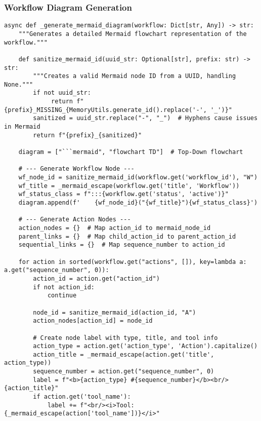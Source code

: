 \documentclass[12pt,a4paper]{article}
\begin{document}
\subsubsection*{Workflow Diagram Generation}
\begin{pageablecode}
\begin{verbatim}
async def _generate_mermaid_diagram(workflow: Dict[str, Any]) -> str:
    """Generates a detailed Mermaid flowchart representation of the workflow."""

    def sanitize_mermaid_id(uuid_str: Optional[str], prefix: str) -> str:
        """Creates a valid Mermaid node ID from a UUID, handling None."""
        if not uuid_str:
             return f"{prefix}_MISSING_{MemoryUtils.generate_id().replace('-', '_')}"
        sanitized = uuid_str.replace("-", "_")  # Hyphens cause issues in Mermaid
        return f"{prefix}_{sanitized}"

    diagram = ["```mermaid", "flowchart TD"]  # Top-Down flowchart

    # --- Generate Workflow Node ---
    wf_node_id = sanitize_mermaid_id(workflow.get('workflow_id'), "W")
    wf_title = _mermaid_escape(workflow.get('title', 'Workflow'))
    wf_status_class = f":::{workflow.get('status', 'active')}"
    diagram.append(f'    {wf_node_id}("{wf_title}"){wf_status_class}')

    # --- Generate Action Nodes ---
    action_nodes = {}  # Map action_id to mermaid_node_id
    parent_links = {}  # Map child_action_id to parent_action_id
    sequential_links = {}  # Map sequence_number to action_id

    for action in sorted(workflow.get("actions", []), key=lambda a: a.get("sequence_number", 0)):
        action_id = action.get("action_id")
        if not action_id:
            continue

        node_id = sanitize_mermaid_id(action_id, "A")
        action_nodes[action_id] = node_id

        # Create node label with type, title, and tool info
        action_type = action.get('action_type', 'Action').capitalize()
        action_title = _mermaid_escape(action.get('title', action_type))
        sequence_number = action.get("sequence_number", 0)
        label = f"<b>{action_type} #{sequence_number}</b><br/>{action_title}"
        if action.get('tool_name'):
            label += f"<br/><i>Tool: {_mermaid_escape(action['tool_name'])}</i>"


\end{verbatim}
\end{pageablecode}
\end{document}
